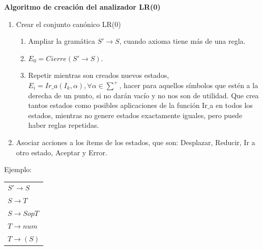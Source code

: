 \documentclass[12pt, twoside, openright]{report} %
\begin{document}
\textbf{Algoritmo de creación del analizador LR(0)}
\begin{enumerate}
  \item Crear el conjunto canónico LR(0)
  \begin{enumerate}
    \item Ampliar la gramática $S'\rightarrow S$, cuando axioma tiene más de una regla.
    \item $E_0 = Cierre(S'\rightarrow S)$.
    \item Repetir mientras son creados nuevos estados, $E_i = Ir\_a(I_k, \alpha), \forall \alpha \in \sum^+$, hacer para aquellos símbolos que estén a la derecha de un punto, si no darán vacío y no nos son de utilidad. Que crea tantos estados como posibles aplicaciones de la función Ir$\_$a en todos los estados, mientras no genere estados exactamente iguales, pero puede haber reglas repetidas.
  \end{enumerate}
  \item Asociar acciones a los ítems de los estados, que son: Desplazar, Reducir, Ir a otro estado, Aceptar y Error.
\end{enumerate}

Ejemplo: 
\begin{table}[H]
  \centering
  \begin{tabular}{l}
  $S' \rightarrow S$     \\
  $S \rightarrow T$      \\
  $S \rightarrow S \textit{op} T$ \\
  $T \rightarrow \textit{num}$    \\
  $T \rightarrow ( S )$ 
  \end{tabular}
  \end{table}
  
\end{document}
